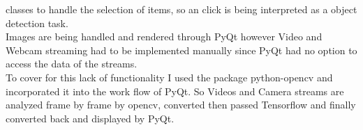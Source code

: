 \begin{itemize}
        classes to handle the selection of items, so an click is being interpreted as a object detection task. \\
        Images are being handled and rendered through PyQt however Video and Webcam streaming had to be implemented manually since PyQt had
        no option to access the data of the streams.\\
        To cover for this lack of functionality I used the package python-opencv and incorporated it into the work flow of PyQt. So Videos
        and Camera streams are analyzed frame by frame by opencv, converted then passed Tensorflow and finally converted back and displayed
        by PyQt.
\end{itemize} 


